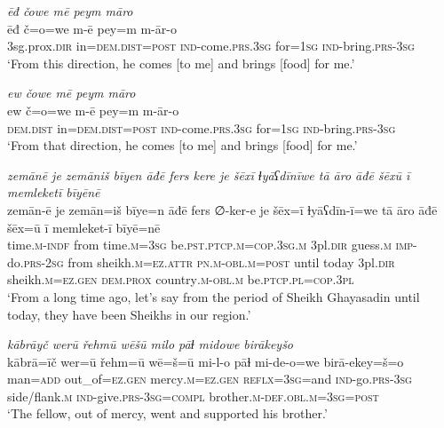 \ea \label{PM.47}
\textit{ēđ čowe mē peym māro} \\ 
\gll ēđ č=o=we m-ē pey=m m-ār-o \\ 
 3sg.prox\textsc{.dir} in=\textsc{dem.dist}\textsc{=\textsc{post}} \textsc{ind-}come\textsc{.prs}\textsc{.3sg} for\textsc{=\textsc{1sg}} \textsc{ind-}bring\textsc{.prs}\textsc{-3sg} \\ 
\glt `From this direction, he  comes [to me] and brings [food] for me.'
\z 
 
\ea \label{PM.48}
\textit{ew čowe mē peym māro} \\ 
\gll ew č=o=we m-ē pey=m m-ār-o \\ 
 \textsc{dem.dist} in=\textsc{dem.dist}\textsc{=\textsc{post}} \textsc{ind-}come\textsc{.prs}\textsc{.3sg} for\textsc{=\textsc{1sg}} \textsc{ind-}bring\textsc{.prs}\textsc{-3sg} \\ 
\glt `From that direction, he  comes [to me] and brings [food] for me.'
\z 
 
\ea \label{DG.8}
\textit{zemānē je zemāniš bīyen āđē fers kere je šēxī ɫyāʕdīnīwe tā āro āđē šēxū ī memleketī bīyēnē} \\ 
\gll zemān-ē je zemān=iš bīye=n āđē fers ∅-ker-e je šēx=ī ɫyāʕdīn-ī=we tā āro āđē šēx=ū ī memleket-ī bīyē=nē \\ 
 time\textsc{.m}\textsc{-indf} from time\textsc{.m}\textsc{=3sg} be\textsc{.pst}\textsc{.ptcp}\textsc{.m}\textsc{=cop}\textsc{.3sg}\textsc{.m} 3pl\textsc{.dir} guess\textsc{.m} \textsc{imp-}do\textsc{.prs}-\textsc{2sg} from sheikh\textsc{.m}\textsc{=ez}.\textsc{attr} \textsc{pn}\textsc{.m}\textsc{-obl}\textsc{.m}\textsc{=\textsc{post}} until today 3pl\textsc{.dir} sheikh\textsc{.m}\textsc{=ez}\textsc{.gen} \textsc{dem.prox} country\textsc{.m}\textsc{-obl}\textsc{.m} be\textsc{.ptcp}\textsc{.pl}\textsc{=cop}\textsc{.3pl} \\ 
\glt `From a long time ago, let’s say from the period of Sheikh Ghayasadin until today, they have been Sheikhs in our region.'
\z 
 
\ea \label{DG.16}
\textit{kābrāyč werū řehmū wēšū milo pāɫ midowe birākeyšo} \\ 
\gll kābrā=īč wer=ū řehm=ū wē=š=ū mi-l-o pāɫ mi-de-o=we birā-ekey=š=o \\ 
 man\textsc{=add} out\_of\textsc{=ez}\textsc{.gen} mercy\textsc{.m}\textsc{=ez}\textsc{.gen} \textsc{reflx}\textsc{=3sg}=and \textsc{ind-}go\textsc{.prs}\textsc{-3sg} side/flank\textsc{.m} \textsc{ind-}give\textsc{.prs}\textsc{-3sg}\textsc{=\textsc{compl}} brother\textsc{.m}\textsc{-def}\textsc{.obl}\textsc{.m}\textsc{=3sg}\textsc{=\textsc{post}} \\ 
\glt `The fellow, out of mercy, went and supported his brother.'
\z 
 
